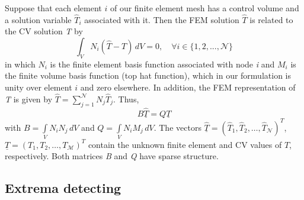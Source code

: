 Suppose that each element $i$ of our finite element mesh has a control volume and a solution variable $\hat T_i$ associated with it. Then the FEM solution $\widehat{T}$ is related to the CV solution \textit{T} by
\begin{displaymath}
\int_{V} N_{i} (\widehat{T} - T) \,d V = 0, \quad
\forall i\in \{1,2,...,{\mathcal N}\}
\end{displaymath}
in which $N_{i}$ is the finite element basis function associated with node \textit{i} and $M_{i}$ is the finite volume basis function (top hat function), which in our formulation is unity over element $i$ and zero elsewhere. In addition, the FEM representation of \textit{T} is given by $\widehat{T} = \sum\limits_{j=1}^{\mathcal{N}} N_{j} \widehat{T}_{j}$. Thus,
\begin{equation}
B \underline{\widehat{T}} = Q \underline{T}
\label{BQ}
\end{equation}
with $B = \int\limits_{V} N_{i} N_{j} \,d V$ and $Q =\int\limits_{V} N_{i} M_{j} \,d V$. The vectors $\underline{\widehat{T}} = \left(\widehat{T}_{1}, \widehat{T}_{2}, \ldots, \widehat{T}_{\mathcal{N}} \right)^{T}$, $\underline{T} =\left(T_{1}, T_{2}, \ldots,  T_\mathcal{M} \right)^{T}$ contain the unknown finite element and CV values of $T$, respectively. Both matrices \textit{B} and \textit{Q} have sparse structure.


\subsection{Extrema detecting}


